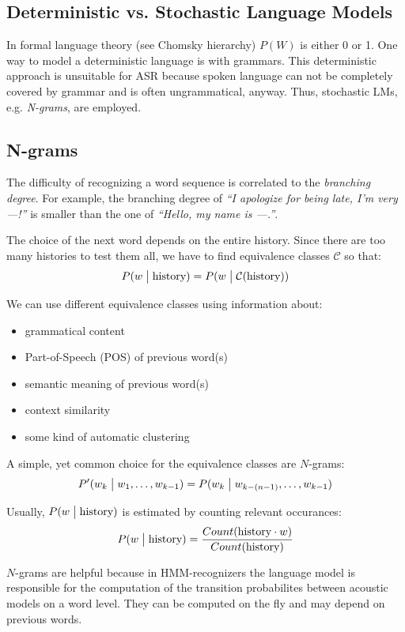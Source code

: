 \subsection{Deterministic vs. Stochastic Language Models}
 
In formal language theory (see Chomsky hierarchy) $P(W)$ is either 0 or 1. One way to model a deterministic language is with grammars. This deterministic approach is unsuitable for ASR because spoken language can not be completely covered by grammar and is often ungrammatical, anyway. Thus, stochastic LMs, e.g. \emph{N-grams}, are employed.

\subsection{N-grams}

The difficulty of recognizing a word sequence is correlated to the \textit{branching degree}. For example, the branching degree of \textit{``I apologize for being late, I'm very ---!''} is smaller than the one of \textit{``Hello, my name is ---.''}.

The choice of the next word depends on the entire history. Since there are too many histories to test them all, we have to find equivalence classes $\mathcal{C}$ so that:
\[
    P(w \bigm| \mbox{history}) = P(w \bigm| \mathcal{C}(\mbox{history}))
\]

We can use different equivalence classes using information about:
\begin{itemize}
\item grammatical content
\item Part-of-Speech (POS) of previous word(s)
\item semantic meaning of previous word(s)
\item context similarity
\item some kind of automatic clustering
\end{itemize}

A simple, yet common choice for the equivalence classes are $N$-grams:
\[
    P'(w_k \bigm| w_1, \ldots, w_{k-1}) = P(w_k \bigm| w_{k - (n - 1)}, \ldots, w_{k-1})
\]

Usually, $P(w \bigm| \mbox{history})$ is estimated by counting relevant occurances:
\[
    P(w \bigm| \mbox{history}) = \frac{Count(\mbox{history} \cdot w)}{Count(\mbox{history})}
\]

$N$-grams are helpful because in HMM-recognizers the language model is responsible for the computation of the transition probabilites between acoustic models on a word level.
They can be computed on the fly and may depend on previous words.

